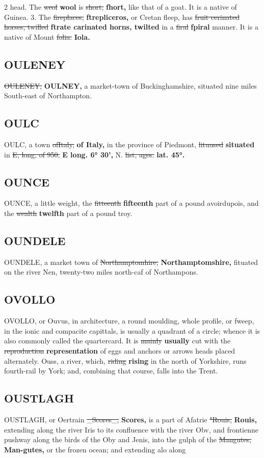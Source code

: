 \documentclass[10pt]{article}
\begin{document}
\begin{multicols}{2}
head. The \sout{weol} \textbf{wool} is \sout{short,} \textbf{fhort,} like that of a goat. It is a native of Guinea. 3. The \sout{fireplaces,} \textbf{ftrepliceros,} or Cretan fleep, has \sout{fruit cerinated horses, twilled} \textbf{ftrate carinated horns, twilted} in a \sout{firal} \textbf{fpiral} manner. It is a native of Mount \sout{folia.} \textbf{Iola.}

\subsection*{OULENEY}
\sout{OULENEY,} \textbf{OULNEY,} a market-town of Buckinghamshire, situated nine miles South-east of Northampton.

\subsection*{OULC}
OULC, a town \sout{ofItaly,} \textbf{of Italy,} in the province of Piedmont, \sout{lituused} \textbf{situated} in \sout{E, long, of 950,} \textbf{E long. 6° 30',} N. \sout{list, ages.} \textbf{lat. 45°.}

\subsection*{OUNCE}
OUNCE, a little weight, the \sout{fitteenth} \textbf{fifteenth} part of a pound avoirdupois, and the \sout{wealth} \textbf{twelfth} part of a pound troy.

\subsection*{OUNDELE}
OUNDELE, a market town of \sout{Northamptomhire,} \textbf{Northamptomshire,} fituated on the river Nen, twenty-two miles north-caf of Northampons.

\subsection*{OVOLLO}
OVOLLO, or Ouvus, in architecture, a round moulding, whole profile, or fweep, in the ionic and compacite capittals, is usually a quadrant of a circle; whence it is also commonly called the quartercard. It is \sout{mainly} \textbf{usually} cut with the \sout{reproduction} \textbf{representation} of eggs and anchors or arrows heads placed alternately. Ouss, a river, which, \sout{riding} \textbf{rising} in the north of Yorkshire, runs fourth-rail by York; and, combining that course, falls into the Trent.

\subsection*{OUSTLAGH}
OUSTLAGH, or Oertrain \sout{\_Scores\_,} \textbf{Scores,} is a part of Afatrie \sout{"Rouis,} \textbf{Rouis,} extending along the river Iris to its confluence with the river Obv, and frontienne pushway along the birds of the Oby and Jenis, into the gulph of the \sout{Mangutes,} \textbf{Man-gutes,} or the frozen ocean; and extending alo along
\end{multicols}
\end{document}
